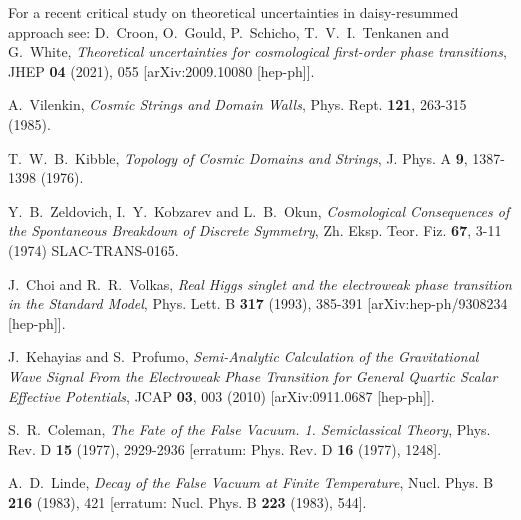 \documentclass[a4paper,11pt]{article}
\begin{document}
\begin{thebibliography}{99}
For a recent critical study on theoretical uncertainties in daisy-resummed approach see: 
D.~Croon, O.~Gould, P.~Schicho, T.~V.~I.~Tenkanen and G.~White,
{\em Theoretical uncertainties for cosmological first-order phase transitions},
JHEP \textbf{04} (2021), 055
[arXiv:2009.10080 [hep-ph]].

A.~Vilenkin, {\em Cosmic Strings and Domain Walls},
Phys. Rept. \textbf{121}, 263-315 (1985).

T.~W.~B.~Kibble, {\em Topology of Cosmic Domains and Strings},
J. Phys. A \textbf{9}, 1387-1398 (1976).

Y.~B.~Zeldovich, I.~Y.~Kobzarev and L.~B.~Okun,
{\em Cosmological Consequences of the Spontaneous Breakdown of Discrete Symmetry},
Zh. Eksp. Teor. Fiz. \textbf{67}, 3-11 (1974) 
SLAC-TRANS-0165.

J.~Choi and R.~R.~Volkas,
{\em Real Higgs singlet and the electroweak phase transition in the Standard Model},
Phys. Lett. B \textbf{317} (1993), 385-391
[arXiv:hep-ph/9308234 [hep-ph]].

J.~Kehayias and S.~Profumo,
{\em Semi-Analytic Calculation of the Gravitational Wave Signal From the Electroweak Phase Transition for General Quartic Scalar Effective Potentials},
JCAP \textbf{03}, 003 (2010)
[arXiv:0911.0687 [hep-ph]].

S.~R.~Coleman,
{\em The Fate of the False Vacuum. 1. Semiclassical Theory},
Phys. Rev. D \textbf{15} (1977), 2929-2936
[erratum: Phys. Rev. D \textbf{16} (1977), 1248].

A.~D.~Linde,
{\em Decay of the False Vacuum at Finite Temperature},
Nucl. Phys. B \textbf{216} (1983), 421
[erratum: Nucl. Phys. B \textbf{223} (1983), 544].


\end{thebibliography}
\end{document}
